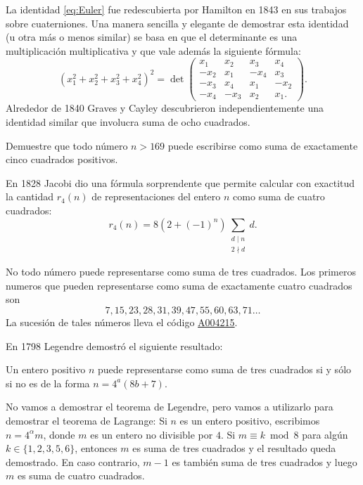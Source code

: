 La identidad \eqref{eq:Euler} fue
redescubierta por Hamilton en 1843 en sus trabajos sobre cuaterniones. Una
manera sencilla y elegante de demostrar esta identidad (u otra más o menos similar) se basa en que el
determinante es una multiplicación multiplicativa y que vale además la
siguiente fórmula:
\[
	(x_1^2+x_2^2+x_3^2+x_4^2)^2=\det\begin{pmatrix}
		x_1 & x_2 & x_3 & x_4\\
		-x_2 & x_1 & -x_4 & x_3\\
		-x_3 & x_4 & x_1 & -x_2\\
		-x_4 & -x_3 & x_2 & x_1.
	\end{pmatrix}.
\]
Alrededor de 1840 Graves y Cayley descubrieron independientemente una identidad
similar que involucra suma de ocho cuadrados. 

\begin{exercise}
	Demuestre que todo número $n>169$ puede escribirse como suma de exactamente
	cinco cuadrados positivos.
\end{exercise}

En 1828 Jacobi dio una fórmula sorprendente que permite calcular con exactitud
la cantidad $r_{4}(n)$ de representaciones del entero $n$ como suma de cuatro
cuadrados:
\[
	r_{4}(n)=8(2+(-1)^n)\sum_{\substack{d\mid n\\2\nmid d}}d.
\]

No todo número puede representarse como suma de tres cuadrados.  Los primeros
numeros que pueden representarse como suma de exactamente cuatro cuadrados son 
\[
	7, 15, 23, 28, 31, 39, 47, 55, 60, 63, 71\dots
\]
La sucesión de tales números lleva el código \href{https://oeis.org/A004215}{A004215}.

En 1798 Legendre demostró el siguiente resultado:

\begin{theorem}[Legendre]
Un entero positivo $n$ puede representarse como suma de tres
cuadrados si y sólo si no es de la forma $n=4^a(8b+7)$. 
\end{theorem}

No vamos a demostrar el teorema de Legendre, pero vamos a utilizarlo 
para demostrar el teorema de Lagrange: Si $n$ es un
entero positivo, escribimos $n=4^{\alpha}m$, donde $m$ es un entero no
divisible por $4$. Si $m\equiv k\bmod 8$ para algún $k\in\{1,2,3,5,6\}$,
entonces $m$ es suma de tres cuadrados y el resultado queda demostrado. En caso
contrario, $m-1$ es también suma de tres cuadrados y luego $m$ es suma de
cuatro cuadrados. 

